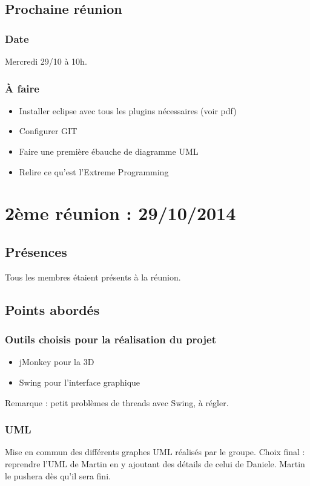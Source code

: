 \documentclass[12pt,a4paper]{article}
\begin{document}
	\subsection{Prochaine réunion}
		\subsubsection{Date}
			Mercredi 29/10 à 10h.
		\subsubsection{À faire}
			\begin{itemize}
				\item Installer eclipse avec tous les plugins nécessaires (voir pdf)
				\item Configurer GIT
				\item Faire une première ébauche de diagramme UML
				\item Relire ce qu'est l'Extreme Programming
			\end{itemize}

\newpage
\section{2ème réunion : 29/10/2014}
	\subsection{Présences}
		Tous les membres étaient présents à la réunion.
	\subsection{Points abordés}
		\subsubsection{Outils choisis pour la réalisation du projet}
			\begin{itemize}
				\item jMonkey pour la 3D
				\item Swing pour l'interface graphique
			\end{itemize}
			Remarque : petit problèmes de threads avec Swing, à régler.
		\subsubsection{UML}
			Mise en commun des différents graphes UML réalisés par le groupe. Choix final : reprendre l'UML de Martin en y ajoutant des détails de celui de Daniele. Martin le pushera dès qu'il sera fini.
\end{document}
